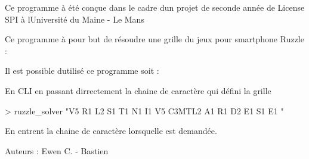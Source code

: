 Ce programme à été conçue dans le cadre d\textquotesingle{}un projet de seconde année de License S\+P\+I à l\textquotesingle{}Université du Maine -\/ Le Mans

Ce programme à pour but de résoudre une grille du jeux pour smartphone Ruzzle \+:



Il est possible d\textquotesingle{}utilisé ce programme soit \+:
\begin{DoxyItemize}
\item En C\+L\+I en passant dirrectement la chaine de caractère qui défini la grille \begin{DoxyVerb}  > ruzzle_solver "V5  R1  L2  S1  T1  N1  I1  V5  C3MTL2  A1  R1  D2  E1  S1  E1  "
\end{DoxyVerb}

\item En entrent la chaine de caractère lorsqu\textquotesingle{}elle est demandée.
\end{DoxyItemize}

Auteurs \+: Ewen C. -\/ Bastien 